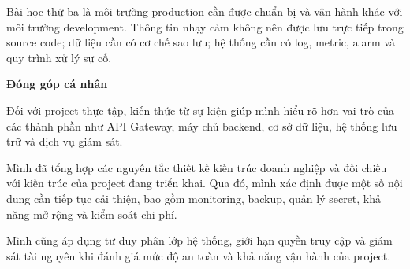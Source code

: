 Bài học thứ ba là môi trường production cần được chuẩn bị và vận hành
khác với môi trường development. Thông tin nhạy cảm không nên được lưu
trực tiếp trong source code; dữ liệu cần có cơ chế sao lưu; hệ thống cần
có log, metric, alarm và quy trình xử lý sự cố.

\vspace{0.5em}\noindent\textbf{Đóng góp cá nhân}\par

Đối với project thực tập, kiến thức từ sự kiện giúp mình hiểu rõ hơn vai
trò của các thành phần như API Gateway, máy chủ backend, cơ sở dữ liệu,
hệ thống lưu trữ và dịch vụ giám sát.

Mình đã tổng hợp các nguyên tắc thiết kế kiến trúc doanh nghiệp và đối
chiếu với kiến trúc của project đang triển khai. Qua đó, mình xác định
được một số nội dung cần tiếp tục cải thiện, bao gồm monitoring, backup,
quản lý secret, khả năng mở rộng và kiểm soát chi phí.

Mình cũng áp dụng tư duy phân lớp hệ thống, giới hạn quyền truy cập và
giám sát tài nguyên khi đánh giá mức độ an toàn và khả năng vận hành của
project.
